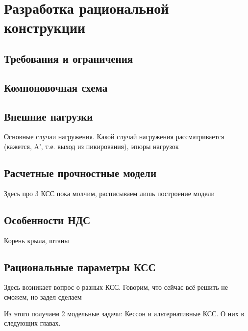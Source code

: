 \chapter{Разработка рациональной конструкции}

\section{Требования и ограничения}



\section{Компоновочная схема}
	

\section{Внешние нагрузки}
Основные случаи нагружения. Какой случай нагружения рассматривается (кажется, A', т.е. выход из пикирования), эпюры нагрузок  

\section{Расчетные прочностные модели}
Здесь про 3 КСС пока молчим, расписываем лишь построение модели




\section{Особенности НДС}
Корень крыла, штаны


\section{Рациональные параметры КСС}
Здесь возникает вопрос о разных КСС. Говорим, что сейчас всё решить не сможем, но задел сделаем

Из этого получаем 2 модельные задачи: Кессон и альтернативные КСС. О них в следующих главах.